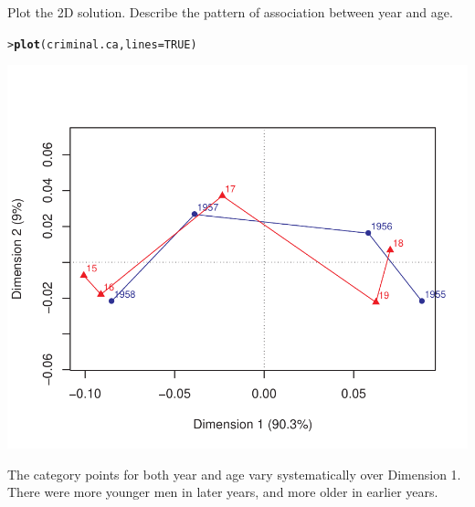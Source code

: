 \documentclass[10pt]{report}\usepackage[]{graphicx}\usepackage[]{color}
\makeatletter
\newcommand{\hlnum}[1]{\textcolor[rgb]{0.686,0.059,0.569}{#1}}%
\newcommand{\hlstd}[1]{\textcolor[rgb]{0.345,0.345,0.345}{#1}}%
\newcommand{\hlkwc}[1]{\textcolor[rgb]{0.333,0.667,0.333}{#1}}%
\newcommand{\hlkwd}[1]{\textcolor[rgb]{0.737,0.353,0.396}{\textbf{#1}}}%
\newenvironment{kframe}{%
 \def\at@end@of@kframe{}%
 \ifinner\ifhmode%
  \def\at@end@of@kframe{\end{minipage}}%
  \begin{minipage}{\columnwidth}%
 \fi\fi%
 \def\FrameCommand##1{\hskip\@totalleftmargin \hskip-\fboxsep
 \colorbox{shadecolor}{##1}\hskip-\fboxsep
     \hskip-\linewidth \hskip-\@totalleftmargin \hskip\columnwidth}%
 \MakeFramed {\advance\hsize-\width
   \@totalleftmargin\z@ \linewidth\hsize
   \@setminipage}}%
 {\par\unskip\endMakeFramed%
 \at@end@of@kframe}
\newenvironment{knitrout}{}{} %
\renewenvironment{knitrout}{\small\renewcommand{\baselinestretch}{.85}}{} %
\makeatother
\begin{document}
\begin{Exercises}
\begin{enumerate*}
    \item Plot the 2D \ca solution. Describe the pattern of association between
    year and age.
    \begin{ans}
\begin{knitrout}\footnotesize
{}\color{fgcolor}\begin{kframe}
\begin{alltt}
\hlstd{> }\hlkwd{plot}\hlstd{(criminal.ca,} \hlkwc{lines}\hlstd{=}\hlnum{TRUE}\hlstd{)}
\end{alltt}
\end{kframe}

\centerline{\includegraphics[width=.5\textwidth]{soln/fig/ex6_2b-1} }



\end{knitrout}
      The category points for both year and age vary systematically over Dimension 1.  There were more younger men in later
      years, and more older in earlier years.
    \end{ans}
    
  \end{enumerate*}
  

\end{Exercises}
\end{document}
